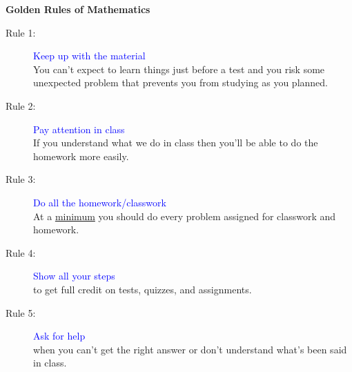 \documentclass[12pt]{article}
\begin{document}
\begin{center}
\Huge{\textbf{Golden Rules of Mathematics}}
\end{center}
\begin{description}
\item[\Large Rule 1:] \Large{\textcolor{blue}{Keep up with the material}}\\
\normalsize{You can't expect to learn things just before a test and you risk some 
unexpected problem that prevents you from studying as you planned.}
\item[\Large Rule 2:] \Large{\textcolor{blue}{Pay attention in class}}\\
\normalsize{If you understand what we do in class then you'll be able to do the 
homework more easily.}
\item[\Large Rule 3:] \Large{\textcolor{blue}{Do all the homework/classwork}}\\
\normalsize{At a \underline{minimum} you should do every problem assigned for classwork 
and homework.}
\item[\Large Rule 4:] \Large{\textcolor{blue}{Show all your steps}}\\
\normalsize{to get full credit on tests, quizzes, and assignments.}
\item[\Large Rule 5:] \Large{\textcolor{blue}{Ask for help}}\\
\normalsize{when you can't get the right answer or don't understand what's been 
said in class.}
\end{description}
\end{document}
